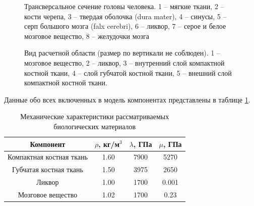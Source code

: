\begin{figure}[h]
\caption{Трансверсальное сечение головы человека. 1 -- мягкие ткани, 2 -- кости черепа, 3 -- твердая оболочка (dura mater), 4 -- синусы, 5 -- серп большого мозга (falx cerebri), 6 -- ликвор, 7 -- серое и белое мозговое вещество, 8 -- желудочки мозга}
\label{pic:cranium_section}
\end{figure}

\begin{figure}[h]
\caption{Вид расчетной области (размер по вертикали не соблюден). 1 -- мозговое вещество, 2 -- ликвор, 3 -- внутренний слой компактной костной ткани, 4 -- слой губчатой костной ткани, 5 -- внешний слой компактной костной ткани.}
\label{pic:cranium_calc_model}
\end{figure}

Данные обо всех включенных в модель компонентах представлены в таблице \ref{tbl:cranium_elastic_parameters}.

\begin{table}[h]
\centering
\caption{Механические характеристики рассматриваемых биологических материалов}
\begin{tabular}{|c|c|c|c|}
\hline
Компонент & $\rho$, кг/м$^{3}$ & $\lambda$, ГПа & $\mu$, ГПа  \\
\hline
Компактная костная ткань & 1.60 & 7900 & 5270 \\
Губчатая костная ткань & 1.50 & 3975 & 2650 \\
Ликвор & 1.00 & 1700 & 0.001 \\
Мозговое вещество & 1.02 & 1700 & 0.23 \\
\hline
\end{tabular}
\label{tbl:cranium_elastic_parameters}
\end{table}

